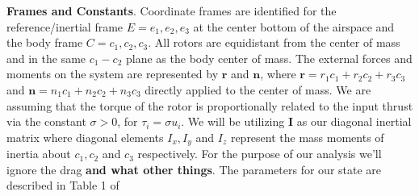 \documentclass{article}
\begin{document}
\begin{multicols}{2}
\noindent \textbf{Frames and Constants}. Coordinate frames are identified for the reference/inertial frame $E={e_1, e_2, e_3}$ at the center bottom of the airspace and the 
body frame $C={c_1, c_2, c_3}$.  All rotors are equidistant from the center of mass and in the same $c_1-c_2 $ plane as the body 
center of mass.  The external forces and moments on the system are represented by $\boldsymbol{r}$ and $\boldsymbol{n}$, where 
$\boldsymbol{r} = r_1 c_1 + r_2 c_2 + r_3 c_3$ and $\boldsymbol{n} = n_1 c_1 + n_2 c_2 + n_3 c_3$ directly applied to the center 
of mass. We are assuming that the torque of the rotor is proportionally related to the input thrust via the constant $\sigma>0$, for $
\tau_i = \sigma u_i$. We will be utilizing $\boldsymbol{I}$ as our diagonal inertial matrix where diagonal elements  $I_x, I_y $ and 
$I_z$ represent the mass moments of inertia about $c_1, c_2 $ and $c_3$ respectively.  For the purpose of our analysis we'll ignore 
the drag \textbf{and what other things}. The parameters for our state are described in Table 1 of \cite{FaalP} %



\end{multicols}
\end{document}
